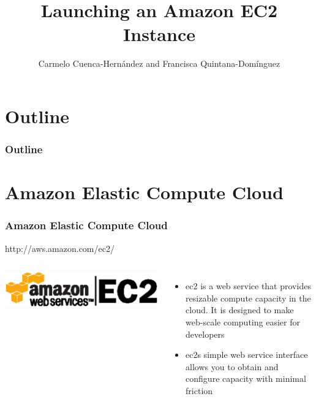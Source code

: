 \documentclass{beamer}
\title{Launching an Amazon EC2 Instance}
\author[C. Cuenca, F. Quintana]{Carmelo Cuenca-Hernández and Francisca Quintana-Domínguez}
\date{}
\begin{document}
\begin{frame}
	\titlepage
\end{frame}


\section*{Outline}
\begin{frame}
  \frametitle{Outline}
  \tableofcontents[currentsection,currentsubsection, sectionstyle=show] 
\end{frame}



\section{Amazon Elastic Compute Cloud}
\begin{frame}[fragile]
\frametitle{Amazon Elastic Compute Cloud}
 http://aws.amazon.com/ec2/
\begin{columns}
 \href{http://aws.amazon.com/ec2/}{\includegraphics[width= 1.4 \textwidth]{aws_ec2.eps}}

 \begin{itemize}
 \item \gls{ec2} is a web service that provides resizable compute capacity in the cloud. It is designed to make web-scale computing easier for developers
 \item \glspl{ec2} simple web service interface allows you to obtain and configure capacity with minimal friction
\end{itemize}

    
  
\end{columns}
   




\end{frame}
\end{document}
